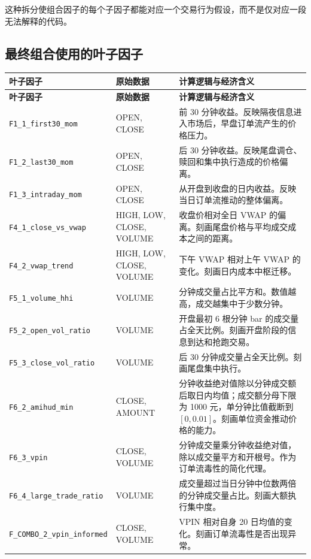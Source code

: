\documentclass[UTF8,11pt,a4paper]{ctexart}
\begin{document}
这种拆分使组合因子的每个子因子都能对应一个交易行为假设，而不是仅对应一段无法解释的代码。

\subsection{最终组合使用的叶子因子}

\footnotesize
\begin{longtable}{p{3.7cm}p{3.0cm}p{7.8cm}}
\toprule
\textbf{叶子因子} & \textbf{原始数据} & \textbf{计算逻辑与经济含义}\\
\midrule
\endfirsthead
\toprule
\textbf{叶子因子} & \textbf{原始数据} & \textbf{计算逻辑与经济含义}\\
\midrule
\endhead
\texttt{F1\_1\_first30\_mom} & OPEN, CLOSE & 前 30 分钟收益。反映隔夜信息进入市场后，早盘订单流产生的价格压力。\\
\texttt{F1\_2\_last30\_mom} & OPEN, CLOSE & 后 30 分钟收益。反映尾盘调仓、赎回和集中执行造成的价格偏离。\\
\texttt{F1\_3\_intraday\_mom} & OPEN, CLOSE & 从开盘到收盘的日内收益。反映当日订单流推动的整体偏离。\\
\texttt{F4\_1\_close\_vs\_vwap} & HIGH, LOW, CLOSE, VOLUME & 收盘价相对全日 VWAP 的偏离。刻画尾盘价格与平均成交成本之间的距离。\\
\texttt{F4\_2\_vwap\_trend} & HIGH, LOW, CLOSE, VOLUME & 下午 VWAP 相对上午 VWAP 的变化。刻画日内成本中枢迁移。\\
\texttt{F5\_1\_volume\_hhi} & VOLUME & 分钟成交量占比平方和。数值越高，成交越集中于少数分钟。\\
\texttt{F5\_2\_open\_vol\_ratio} & VOLUME & 开盘最初 6 根分钟 bar 的成交量占全天比例。刻画开盘阶段的信息到达和抢跑交易。\\
\texttt{F5\_3\_close\_vol\_ratio} & VOLUME & 后 30 分钟成交量占全天比例。刻画尾盘集中执行。\\
\texttt{F6\_2\_amihud\_min} & CLOSE, AMOUNT & 分钟收益绝对值除以分钟成交额后取日内均值；成交额分母下限为 1000 元，单分钟比值截断到 $[0,0.01]$。刻画单位资金推动价格的能力。\\
\texttt{F6\_3\_vpin} & CLOSE, VOLUME & 分钟成交量乘分钟收益绝对值，除以成交量平方和开根号。作为订单流毒性的简化代理。\\
\texttt{F6\_4\_large\_trade\_ratio} & VOLUME & 成交量超过当日分钟中位数两倍的分钟成交量占比。刻画大额执行集中度。\\
\texttt{F\_COMBO\_2\_vpin\_informed} & CLOSE, VOLUME & VPIN 相对自身 20 日均值的变化。刻画订单流毒性是否出现异常。\\

\end{longtable}
\end{document}
